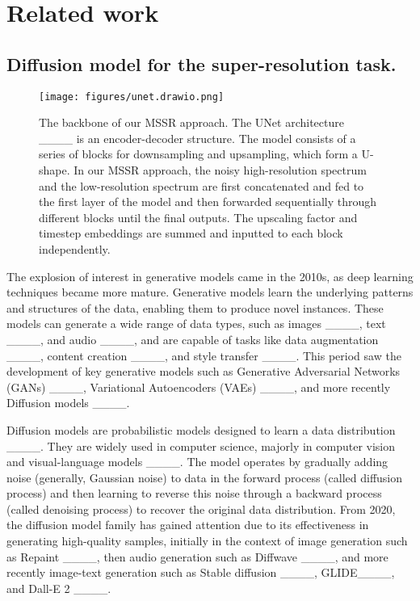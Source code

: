 \section{Related work}
\subsection{Diffusion model for the super-resolution task.}
\begin{figure*}[tb]
    \centering
    \texttt{[image: figures/unet.drawio.png]}
    \caption{The backbone of our MSSR approach. The UNet architecture ____ is an encoder-decoder structure. 
    The model consists of a series of blocks for downsampling and upsampling, which form a U-shape.  In our MSSR approach, the noisy high-resolution spectrum and the low-resolution spectrum are first concatenated and fed to the first layer of the model and then forwarded sequentially through different blocks until the final outputs. The upscaling factor and timestep embeddings are summed and inputted to each block independently.}
    \label{fig:unet}
\end{figure*}

The explosion of interest in generative models came in the 2010s, as deep learning techniques became more mature. 
Generative models learn the underlying patterns and structures of the data, enabling them to produce novel instances. These models can generate a wide range of data types, such as images ____, text ____, and audio ____, and are capable of tasks like data augmentation ____, content creation ____, and style transfer ____.
This period saw the development of key generative models such as Generative Adversarial Networks (GANs) ____, Variational Autoencoders (VAEs) ____, and more recently Diffusion models ____.


Diffusion models are probabilistic models designed to learn a data distribution ____. 
They are widely used in computer science, majorly in computer vision and visual-language models ____.
The model operates by gradually adding noise (generally, Gaussian noise) to data in the forward process (called diffusion process) and then learning to reverse this noise through a backward process (called denoising process) to recover the original data distribution.
From 2020, the diffusion model family has gained attention due to its effectiveness in generating high-quality samples, initially in the context of image generation such as Repaint ____, then audio generation such as Diffwave ____, and more recently image-text generation such as Stable diffusion ____, GLIDE____, and Dall-E 2 ____.



